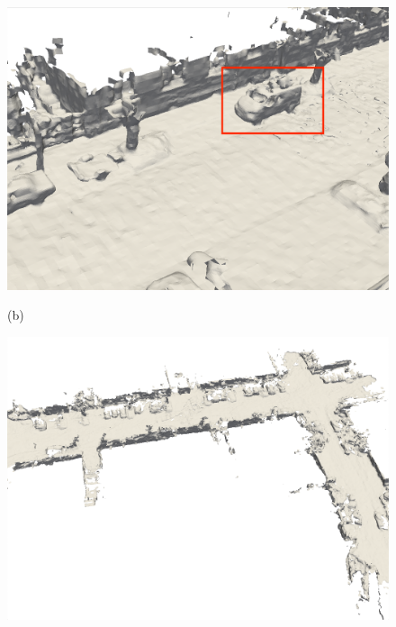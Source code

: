 \begin{figure}[htbp]
\begin{minipage}{0.322\linewidth}
	\end{minipage}\hfill
    \begin{minipage}{0.322\linewidth}
		\centering
		\includegraphics[width=1\linewidth]{figures/kitti_3_vox.png}
	\end{minipage}\vfill
    (b)
	\begin{minipage}{0.322\linewidth}
		\centering
		\includegraphics[width=1\linewidth]{figures/kitti_1_bce.png}
	\end{minipage}\hfill
	\begin{minipage}{0.322\linewidth}
		\centering

\end{minipage}
\end{figure}
